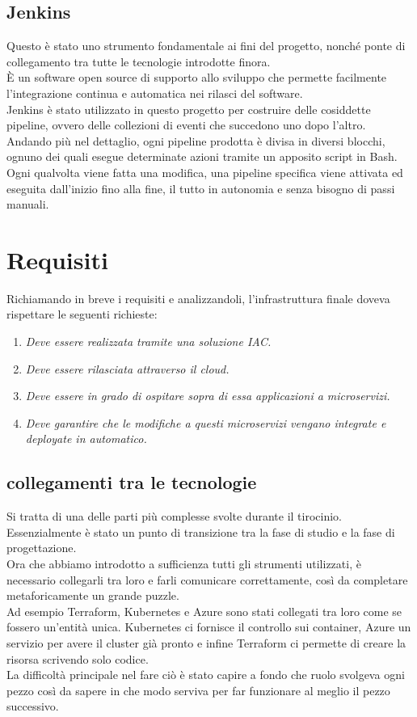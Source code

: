 \documentclass[a4paper,12pt]{report}
\begin{document}
\subsection{Jenkins}
Questo è stato uno strumento fondamentale ai fini del progetto, nonché ponte di collegamento tra tutte le tecnologie introdotte finora. \\
È un software open source di supporto allo sviluppo che permette facilmente l'integrazione continua e automatica nei rilasci del software.\cite{jenkins}\\
Jenkins è stato utilizzato in questo progetto per costruire delle cosiddette pipeline, ovvero delle collezioni di eventi che succedono uno dopo l'altro. Andando più nel dettaglio, ogni pipeline prodotta è divisa in diversi blocchi, ognuno dei quali esegue determinate azioni tramite un apposito script in Bash.\\
Ogni qualvolta viene fatta una modifica, una pipeline specifica viene attivata ed eseguita dall'inizio fino alla fine, il tutto in autonomia e senza bisogno di passi manuali.
\section{Requisiti}
Richiamando in breve i requisiti e analizzandoli, l'infrastruttura finale doveva rispettare le seguenti richieste:\\
\begin{enumerate}
\item \textit{Deve essere realizzata tramite una soluzione IAC.}
\item \textit{Deve essere rilasciata attraverso il cloud.}
\item \textit{Deve essere in grado di ospitare sopra di essa applicazioni a microservizi.}
\item \textit{Deve garantire che le modifiche a questi microservizi vengano integrate e deployate in automatico. }
\end{enumerate}
\subsection{collegamenti tra le tecnologie}
Si tratta di una delle parti più complesse svolte durante il tirocinio. Essenzialmente è stato un punto di transizione tra la fase di studio e la fase di progettazione.\\
Ora che abbiamo introdotto a sufficienza tutti gli strumenti utilizzati, è necessario collegarli tra loro e farli comunicare correttamente, così da completare metaforicamente un grande puzzle.\\
Ad esempio Terraform, Kubernetes e Azure sono stati collegati tra loro come se fossero un'entità unica. Kubernetes ci fornisce il controllo sui container, Azure un servizio per avere il cluster già pronto e infine Terraform ci permette di creare la risorsa scrivendo solo codice. \\
La difficoltà principale nel fare ciò è stato capire a fondo che ruolo svolgeva ogni pezzo così da sapere in che modo serviva per far funzionare al meglio il pezzo successivo.
\end{document}
